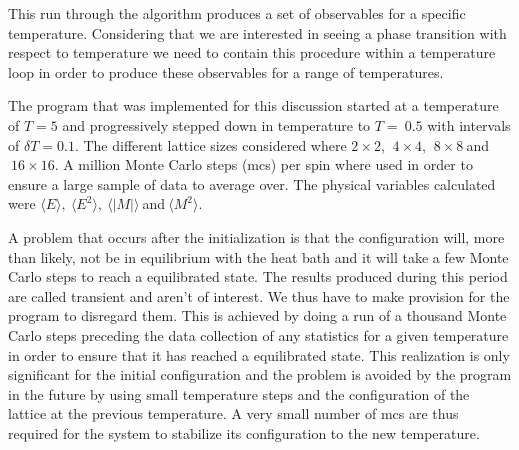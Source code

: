 \documentclass[a4paper]{article}
\newcommand{\bra}{\langle}
\newcommand{\ket}{\rangle}
\begin{document}
This run through the algorithm produces a set of observables for a
specific temperature. Considering that we are interested in
seeing a phase transition with respect to temperature %
we need to contain this procedure within a temperature loop in order to 
produce these observables for a range of temperatures. 

The program that was implemented for this discussion started at a
temperature of $T=5$ and progressively stepped down in temperature to
$T=~0.5$ with intervals of $\delta T=0.1$. The different lattice
sizes considered where $2\times 2$, $\ 4\times 4$, $\ 8\times 8 \ $and$ 
\ 16\times 16$. A million Monte Carlo steps (mcs) per spin where used in
order to ensure a large sample of data to average over. The physical
variables calculated were $\bra E \ket,\ \bra E^2 \ket, \ \bra |M|
\ket \ $and$ \ \bra M^2 \ket$. 

A problem that occurs after the initialization is that the
configuration will, more than likely, not be in equilibrium with the
heat bath and it will take a few Monte Carlo steps to reach a
equilibrated state. The results produced during this period are
called transient and aren't of interest. We thus have to make
provision for the program to 
disregard them. This is achieved by doing a run of a thousand Monte
Carlo steps preceding the data collection of any statistics for a
given temperature in order to ensure that it has reached a
equilibrated state. This realization is only significant for the
initial configuration and the problem is avoided by the program in the
future by using small temperature steps and the 
configuration of the lattice at the previous temperature. A very small 
number of mcs are thus required for the system to stabilize its
configuration to the new temperature. 

\end{document}
